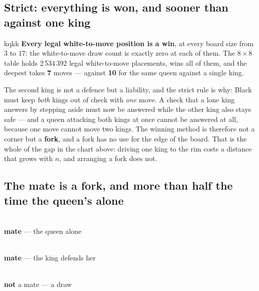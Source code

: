 \documentclass[11pt]{article}
\begin{document}
\subsection{Strict: everything is won, and sooner than against one king}\label{sub:kqkk-strict}

\begin{result}[title={KQKK under the strict rule}]{kqkk}
\textbf{Every legal white-to-move position is a win}, at every board size from
$3$ to $17$: the white-to-move draw count is exactly zero at each of them. The
$8\times8$ table holds 2\,534\,392 legal white-to-move placements, wins all of
them, and the deepest takes \textbf{7} moves --- against \textbf{10} for the
same queen against a single king.
\end{result}

\noindent
The second king is not a defence but a liability, and the strict rule is why:
Black must keep \emph{both} kings out of check with \emph{one} move. A check
that a lone king answers by stepping aside must now be answered while the other
king also stays safe --- and a queen attacking both kings at once cannot be
answered at all, because one move cannot move two kings. The winning method is
therefore not a corner but a \textbf{fork}, and a fork has no use for the edge
of the board. That is the whole of the gap in the chart above: driving one king
to the rim costs a distance that grows with $n$, and arranging a fork does not.

\subsection{The mate is a fork, and more than half the time the queen's alone}\label{sub:kqkk-fork}

\begin{center}
\begin{minipage}{0.3\textwidth}\centering
  \\[1.5mm]
  {\small\color{kqkk}\textbf{mate} --- the queen alone}
\end{minipage}\hfill
\begin{minipage}{0.3\textwidth}\centering
  \\[1.5mm]
  {\small\color{kqkk}\textbf{mate} --- the king defends her}
\end{minipage}\hfill
\begin{minipage}{0.3\textwidth}\centering
  \\[1.5mm]
  {\small\color{inksoft}\textbf{not} a mate --- a draw}
\end{minipage}
\end{center}
\end{document}
